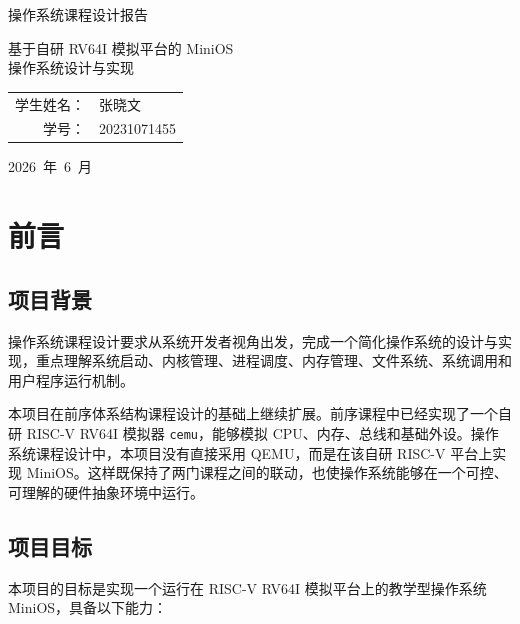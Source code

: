 \documentclass[UTF8,a4paper,12pt,openany,fontset=fandol]{ctexrep}
\renewcommand{\arraystretch}{1.25}
\begin{document}
\begin{titlepage}
  \thispagestyle{empty}
  \centering
  \vspace*{2.1cm}
  {\heiti{} 操作系统课程设计报告\par}
  \vspace{1.5cm}
  {\heiti{} 基于自研 RV64I 模拟平台的 MiniOS\\[0.35cm]
  操作系统设计与实现\par}
  \vfill
  \renewcommand{\arraystretch}{1.7}
  {
  \begin{tabular}{>{\heiti}r l}
    学生姓名： & 张晓文 \\
    学\hspace{2em}号： & 20231071455 \\
  \end{tabular}\par}
  \vfill
  {\mbox{2026 年 6 月}\par}
  \vspace*{1.5cm}
\end{titlepage}

\tableofcontents
\clearpage
{}
\setcounter{page}{1}
\chapter{前言}

\section{项目背景}

操作系统课程设计要求从系统开发者视角出发，完成一个简化操作系统的设计与实现，重点理解系统启动、内核管理、进程调度、内存管理、文件系统、系统调用和用户程序运行机制。

本项目在前序体系结构课程设计的基础上继续扩展。前序课程中已经实现了一个自研 RISC-V RV64I 模拟器 \nolinkurl{cemu}，能够模拟 CPU、内存、总线和基础外设。操作系统课程设计中，本项目没有直接采用 QEMU，而是在该自研 RISC-V 平台上实现 MiniOS。这样既保持了两门课程之间的联动，也使操作系统能够在一个可控、可理解的硬件抽象环境中运行。

\section{项目目标}

本项目的目标是实现一个运行在 RISC-V RV64I 模拟平台上的教学型操作系统 MiniOS，具备以下能力：
\end{document}
